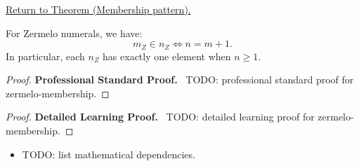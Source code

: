\newpage
{}
\label{prf:zermelo-membership}

\begin{remark*}[Return]
\hyperref[prop:zermelo-membership]{Return to Theorem (Membership pattern).}
\end{remark*}

\begin{theorem*}
For Zermelo numerals, we have:
\[
m_Z \in n_Z \iff n = m+1.
\]
In particular, each $n_Z$ has exactly one element when $n\ge 1$.
\end{theorem*}

\begin{proof}
\textbf{Professional Standard Proof.}~
TODO: professional standard proof for zermelo-membership.
\end{proof}

\begin{proof}
\textbf{Detailed Learning Proof.}~
TODO: detailed learning proof for zermelo-membership.
\end{proof}

\begin{remark*}
\end{remark*}

\begin{dependencies}
\begin{itemize}
  \item TODO: list mathematical dependencies.
\end{itemize}
\end{dependencies}

\clearpage
